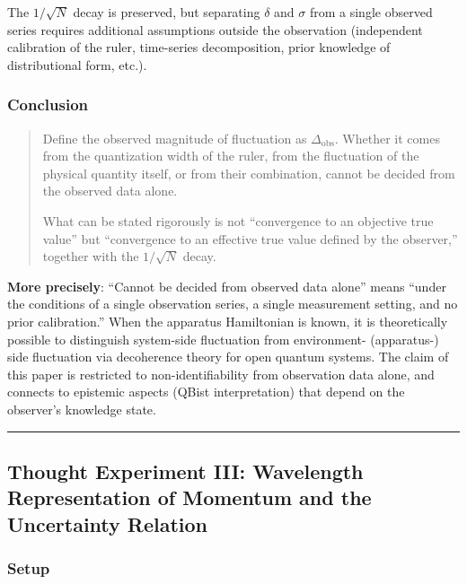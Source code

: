 \documentclass[
]{article}
\begin{document}
The \(1/\sqrt{N}\) decay is preserved, but separating \(\delta\) and
\(\sigma\) from a single observed series requires additional assumptions
outside the observation (independent calibration of the ruler,
time-series decomposition, prior knowledge of distributional form,
etc.).

\subsubsection{Conclusion}\label{conclusion-1}

\begin{quote}
Define the observed magnitude of fluctuation as
\(\Delta_{\mathrm{obs}}\). Whether it comes from the quantization width
of the ruler, from the fluctuation of the physical quantity itself, or
from their combination, cannot be decided from the observed data alone.

What can be stated rigorously is not ``convergence to an objective true
value'' but ``convergence to an effective true value defined by the
observer,'' together with the \(1/\sqrt{N}\) decay.
\end{quote}

\textbf{More precisely}: ``Cannot be decided from observed data alone''
means ``under the conditions of a single observation series, a single
measurement setting, and no prior calibration.'' When the apparatus
Hamiltonian is known, it is theoretically possible to distinguish
system-side fluctuation from environment- (apparatus-) side fluctuation
via decoherence theory for open quantum systems. The claim of this paper
is restricted to non-identifiability from observation data alone, and
connects to epistemic aspects (QBist interpretation) that depend on the
observer's knowledge state.

\begin{center}\rule{0.5\linewidth}{0.5pt}\end{center}

\subsection{Thought Experiment III: Wavelength Representation of
Momentum and the Uncertainty
Relation}\label{thought-experiment-iii-wavelength-representation-of-momentum-and-the-uncertainty-relation}

\subsubsection{Setup}\label{setup-2}
\end{document}
